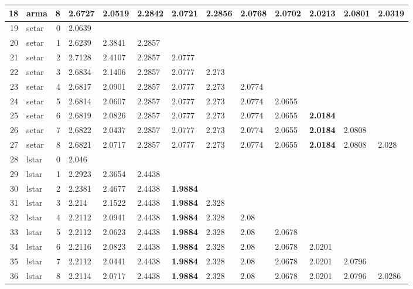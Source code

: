 \documentclass[10pt,a4paper]{article}
\begin{document}
\begin{table}[ht]
\begin{tabular}{rlrllllllllll}
  18 & arma &     8 & 2.6727 & 2.0519 & 2.2842 & 2.0721 & 2.2856 & 2.0768 & 2.0702 & \textbf{2.0213} & 2.0801 & 2.0319 \\ 
   \hline
19 & setar &     0 & 2.0639 &  &  &  &  &  &  &  &  &  \\ 
  20 & setar &     1 & 2.6239 & 2.3841 & 2.2857 &  &  &  &  &  &  &  \\ 
  21 & setar &     2 & 2.7128 & 2.4107 & 2.2857 & 2.0777 &  &  &  &  &  &  \\ 
  22 & setar &     3 & 2.6834 & 2.1406 & 2.2857 & 2.0777 & 2.273 &  &  &  &  &  \\ 
  23 & setar &     4 & 2.6817 & 2.0901 & 2.2857 & 2.0777 & 2.273 & 2.0774 &  &  &  &  \\ 
  24 & setar &     5 & 2.6814 & 2.0607 & 2.2857 & 2.0777 & 2.273 & 2.0774 & 2.0655 &  &  &  \\ 
  25 & setar &     6 & 2.6819 & 2.0826 & 2.2857 & 2.0777 & 2.273 & 2.0774 & 2.0655 & \textbf{2.0184} &  &  \\ 
  26 & setar &     7 & 2.6822 & 2.0437 & 2.2857 & 2.0777 & 2.273 & 2.0774 & 2.0655 & \textbf{2.0184} & 2.0808 &  \\ 
  27 & setar &     8 & 2.6821 & 2.0717 & 2.2857 & 2.0777 & 2.273 & 2.0774 & 2.0655 & \textbf{2.0184} & 2.0808 & 2.028 \\ 
   \hline
28 & lstar &     0 & 2.046 &  &  &  &  &  &  &  &  &  \\ 
  29 & lstar &     1 & 2.2923 & 2.3654 & 2.4438 &  &  &  &  &  &  &  \\ 
  30 & lstar &     2 & 2.2381 & 2.4677 & 2.4438 & \textbf{1.9884} &  &  &  &  &  &  \\ 
  31 & lstar &     3 & 2.214 & 2.1522 & 2.4438 & \textbf{1.9884} & 2.328 &  &  &  &  &  \\ 
  32 & lstar &     4 & 2.2112 & 2.0941 & 2.4438 & \textbf{1.9884} & 2.328 & 2.08 &  &  &  &  \\ 
  33 & lstar &     5 & 2.2112 & 2.0623 & 2.4438 & \textbf{1.9884} & 2.328 & 2.08 & 2.0678 &  &  &  \\ 
  34 & lstar &     6 & 2.2116 & 2.0823 & 2.4438 & \textbf{1.9884} & 2.328 & 2.08 & 2.0678 & 2.0201 &  &  \\ 
  35 & lstar &     7 & 2.2112 & 2.0441 & 2.4438 & \textbf{1.9884} & 2.328 & 2.08 & 2.0678 & 2.0201 & 2.0796 &  \\ 
  36 & lstar &     8 & 2.2114 & 2.0717 & 2.4438 & \textbf{1.9884} & 2.328 & 2.08 & 2.0678 & 2.0201 & 2.0796 & 2.0286 \\ 
   \hline

\end{tabular}
\end{table}
\end{document}
